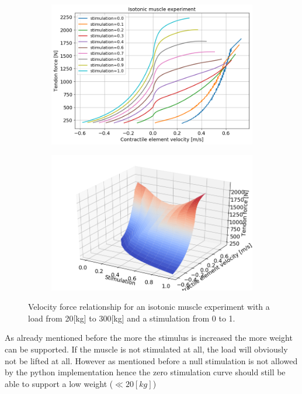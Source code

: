 \documentclass{cmc}
\begin{document}
\begin{figure}[H]
\centering
\begin{subfigure}[b]{0.49\textwidth}
         \centering
         \includegraphics[width=\textwidth]{figures/1_d_isotonic_stim_var.png}
         \label{fig:isotonic_stim}
     \end{subfigure}
\begin{subfigure}[b]{0.49\textwidth}
         \centering
         \includegraphics[width=\textwidth]{figures/1_d_isotonic_3d.png}
         \label{fig:isotonic_3d}
     \end{subfigure}
    
     \caption{Velocity force relationship for an isotonic muscle experiment with a load from 20[kg] to 300[kg] and a stimulation from 0 to 1.}
     \label{fig:Exercise1e}
\end{figure}

As already mentioned before the more the stimulus is increased the more weight can be supported. If the muscle is not stimulated at all, the load will obviously not be lifted at all. However as mentioned before a null stimulation is not allowed by the python implementation hence the zero stimulation curve should still be able to support a low weight ($\ll20[kg]$)
\end{document}
